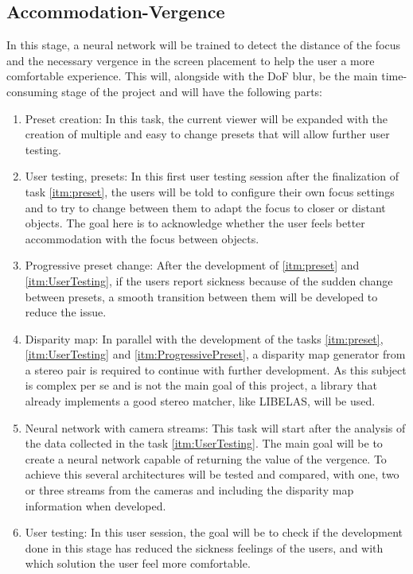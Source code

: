 \documentclass[10pt,a4paper,twocolumn,twoside]{article}
\begin{document}
	\subsection{Accommodation-Vergence}
	\label{subsec:vergence}
	In this stage, a neural network will be trained to detect the distance of the focus and the necessary vergence in the screen placement to help the user a more comfortable experience.
	This will, alongside with the DoF blur, be the main time-consuming stage of the project and will have the following parts:
	\begin{enumerate}
		\item \label{itm:preset}  Preset creation: In this task, the current viewer will be expanded with the creation of multiple and easy to change presets that will allow further user testing.
		
		\item \label{itm:UserTesting} User testing, presets: In this first user testing session after the finalization of task \ref{itm:preset}, the users will be told to configure their own focus settings and to try to change between them to adapt the focus to closer or distant objects. The goal here is to acknowledge whether the user feels better accommodation with the focus between objects.
		
		\item \label{itm:ProgressivePreset} Progressive preset change: After the development of \ref{itm:preset} and \ref{itm:UserTesting}, if the users report sickness because of the sudden change between presets, a smooth transition between them will be developed to reduce the issue. 
		
		\item Disparity map: In parallel with the development of the tasks \ref{itm:preset}, \ref{itm:UserTesting} and \ref{itm:ProgressivePreset}, a disparity map generator from a stereo pair is required to continue with further development. As this subject is complex per se and is not the main goal of this project, a library that already implements a good stereo matcher, like LIBELAS\cite{web:LIBELAS}, will be used. 
		
		\item Neural network with camera streams: This task will start after the analysis of the data collected in the task \ref{itm:UserTesting}. The main goal will be to create a neural network capable of returning the value of the vergence. To achieve this several architectures will be tested and compared, with one, two or three streams from the cameras and including the disparity map information when developed.
		
		\item User testing: In this user session, the goal will be to check if the development done in this stage has reduced the sickness feelings of the users, and with which solution the user feel more comfortable.
	\end{enumerate}
	
\end{document}
